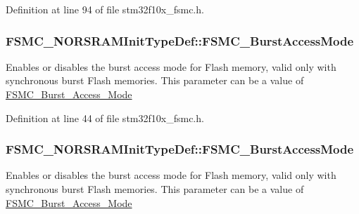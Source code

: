Definition at line 94 of file stm32f10x\+\_\+fsmc.\+h.

\subsubsection[{\texorpdfstring{F\+S\+M\+C\+\_\+\+Burst\+Access\+Mode}{FSMC_BurstAccessMode}}]{ F\+S\+M\+C\+\_\+\+N\+O\+R\+S\+R\+A\+M\+Init\+Type\+Def\+::\+F\+S\+M\+C\+\_\+\+Burst\+Access\+Mode}\hypertarget{struct_f_s_m_c___n_o_r_s_r_a_m_init_type_def_af043f4c3f54c19749d6598d9f5091432}{}\label{struct_f_s_m_c___n_o_r_s_r_a_m_init_type_def_af043f4c3f54c19749d6598d9f5091432}
Enables or disables the burst access mode for Flash memory, valid only with synchronous burst Flash memories. This parameter can be a value of \hyperlink{group___f_s_m_c___burst___access___mode}{F\+S\+M\+C\+\_\+\+Burst\+\_\+\+Access\+\_\+\+Mode} 

Definition at line 44 of file stm32f10x\+\_\+fsmc.\+h.

\subsubsection[{\texorpdfstring{F\+S\+M\+C\+\_\+\+Burst\+Access\+Mode}{FSMC_BurstAccessMode}}]{ F\+S\+M\+C\+\_\+\+N\+O\+R\+S\+R\+A\+M\+Init\+Type\+Def\+::\+F\+S\+M\+C\+\_\+\+Burst\+Access\+Mode}\hypertarget{struct_f_s_m_c___n_o_r_s_r_a_m_init_type_def_aec0bfff5c934c251c21450a50f5bdb79}{}\label{struct_f_s_m_c___n_o_r_s_r_a_m_init_type_def_aec0bfff5c934c251c21450a50f5bdb79}
Enables or disables the burst access mode for Flash memory, valid only with synchronous burst Flash memories. This parameter can be a value of \hyperlink{group___f_s_m_c___burst___access___mode}{F\+S\+M\+C\+\_\+\+Burst\+\_\+\+Access\+\_\+\+Mode} 

